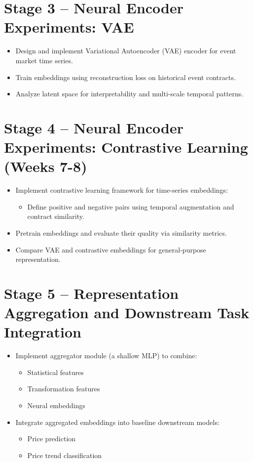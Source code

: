 \section{Stage 3 – Neural Encoder Experiments: VAE}

\begin{itemize}
    \item Design and implement Variational Autoencoder (VAE) encoder for event market time series.
    \item Train embeddings using reconstruction loss on historical event contracts.
    \item Analyze latent space for interpretability and multi-scale temporal patterns.
\end{itemize}

\section{Stage 4 – Neural Encoder Experiments: Contrastive Learning (Weeks 7-8)}

\begin{itemize}
    \item Implement contrastive learning framework for time-series embeddings:
        \begin{itemize}
            \item Define positive and negative pairs using temporal augmentation and contract similarity.
        \end{itemize}
    \item Pretrain embeddings and evaluate their quality via similarity metrics.
    \item Compare VAE and contrastive embeddings for general-purpose representation.
\end{itemize}

\section{Stage 5 – Representation Aggregation and Downstream Task Integration}

\begin{itemize}
    \item Implement aggregator module (a shallow MLP) to combine:
        \begin{itemize}
            \item Statistical features
            \item Transformation features
            \item Neural embeddings
        \end{itemize}
    \item Integrate aggregated embeddings into baseline downstream models:
        \begin{itemize}
            \item Price prediction
            \item Price trend classification
        \end{itemize}
\end{itemize}

